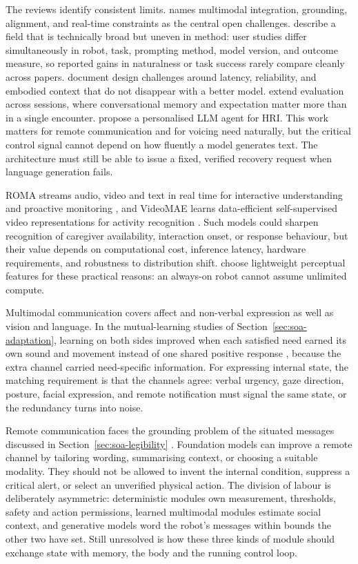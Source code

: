 The reviews identify consistent limits. \citet{Wang2026HumanModalities} names multimodal integration, grounding, alignment, and real-time constraints as the central open challenges. \citet{Wang2026LLMHRISystematic} describe a field that is technically broad but uneven in method: user studies differ simultaneously in robot, task, prompting method, model version, and outcome measure, so reported gains in naturalness or task success rarely compare cleanly across papers. \citet{PintoBernal2025Designing} document design challenges around latency, reliability, and embodied context that do not disappear with a better model. \citet{Mauliana2025MultiSession} extend evaluation across sessions, where conversational memory and expectation matter more than in a single encounter. \citet{Ghamati2025PersonalisedLLM} propose a personalised LLM agent for HRI. This work matters for remote communication and for voicing need naturally, but the critical control signal cannot depend on how fluently a model generates text. The architecture must still be able to issue a fixed, verified recovery request when language generation fails.

ROMA streams audio, video and text in real time for interactive understanding and proactive monitoring \citep{Tian2026ROMA}, and VideoMAE learns data-efficient self-supervised video representations for activity recognition \citep{Tong2022VideoMAE}. Such models could sharpen recognition of caregiver availability, interaction onset, or response behaviour, but their value depends on computational cost, inference latency, hardware requirements, and robustness to distribution shift. \citet{Pasquali2025AlwaysOn} choose lightweight perceptual features for these practical reasons: an always-on robot cannot assume unlimited compute.

Multimodal communication covers affect and non-verbal expression as well as vision and language. In the mutual-learning studies of Section~\ref{sec:soa-adaptation}, learning on both sides improved when each satisfied need earned its own sound and movement instead of one shared positive response \citep{Markelius2023MutualLearning,Heikkinen2024MutualLearning}, because the extra channel carried need-specific information. For expressing internal state, the matching requirement is that the channels agree: verbal urgency, gaze direction, posture, facial expression, and remote notification must signal the same state, or the redundancy turns into noise.

Remote communication faces the grounding problem of the situated messages discussed in Section~\ref{sec:soa-legibility} \citep{Marquardt2009SituatedMessages}. Foundation models can improve a remote channel by tailoring wording, summarising context, or choosing a suitable modality. They should not be allowed to invent the internal condition, suppress a critical alert, or select an unverified physical action. The division of labour is deliberately asymmetric: deterministic modules own measurement, thresholds, safety and action permissions, learned multimodal modules estimate social context, and generative models word the robot's messages within bounds the other two have set. Still unresolved is how these three kinds of module should exchange state with memory, the body and the running control loop.

